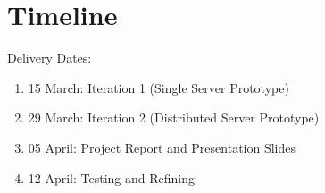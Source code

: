 

\section{Timeline}
\label{sec:timeline}
Delivery Dates:
\begin{enumerate}
	\item 15 March: Iteration 1 (Single Server Prototype)
	\item 29 March: Iteration 2 (Distributed Server Prototype)
	\item 05 April: Project Report and Presentation Slides
	\item 12 April: Testing and Refining
\end{enumerate}
